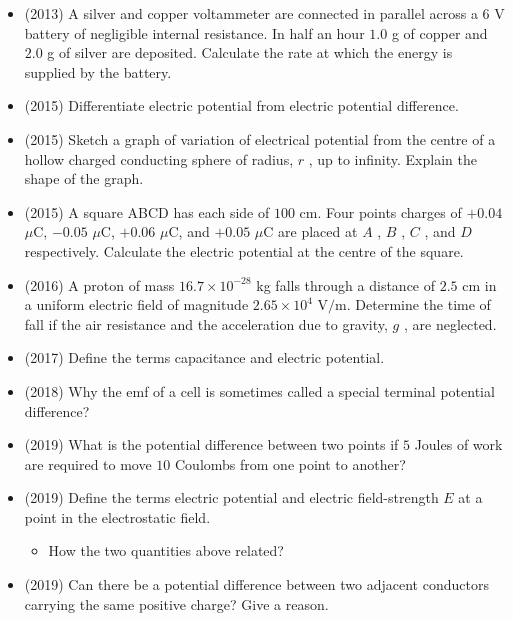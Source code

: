 \documentclass{article}
\begin{document}
\begin{itemize}
\item (2013)  A silver and copper voltammeter are connected in parallel across a $ 6$ V battery of negligible internal resistance. In half an hour $ 1.0$ g of copper and $ 2.0$ g of silver are deposited. Calculate the rate at which the energy is supplied by the battery. 
\item (2015)  Differentiate electric potential from electric potential difference.
\item (2015)  Sketch a graph of variation of electrical potential from the centre of a hollow charged conducting sphere of radius, $ r$ , up to infinity.  Explain the shape of the graph.
\item (2015)  A square ABCD has each side of $ 100$ cm.  Four points charges of $ +0.04$ $\mu$C, $ -0.05$ $\mu$C, $ +0.06$ $\mu$C, and $ +0.05$ $\mu$C are placed at $ A$ , $ B$ , $ C$ , and $ D$ respectively.  Calculate the electric potential at the centre of the square.
\item (2016)  A proton of mass $ 16.7 \times 10^{-28}$ kg falls through a distance of $ 2.5$ cm in a uniform electric field of magnitude $ 2.65 \times 10^{4}$ V$/$m.  Determine the time of fall if the air resistance and the acceleration due to gravity, $ g$ , are neglected.
\item (2017)  Define the terms capacitance and electric potential. 
\item (2018)  Why the emf of a cell is sometimes called a special terminal potential difference? 
\item (2019)  What is the potential difference between two points if $ 5$ Joules of work are required to move $ 10$ Coulombs from one point to another? 
\item (2019)  Define the terms electric potential and electric field-strength $ E$ at a point in the electrostatic field.\begin{itemize}
\item How the two quantities above related? 
\end{itemize}
\item (2019)  Can there be a potential difference between two adjacent conductors carrying the same positive charge? Give a reason. 
\end{itemize}
\end{document}
